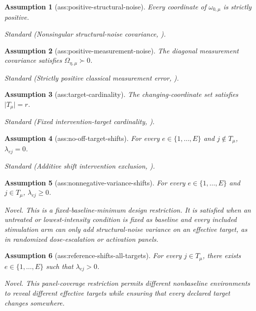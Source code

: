 \documentclass{article}
\newtheorem{assumption}{Assumption}
\begin{document}
\begin{assumption}[ass:positive-structural-noise]\label{ass:positive-structural-noise}
Every coordinate of \(\omega_{0,\mu}\) is strictly positive.
\par\smallskip\noindent\emph{Standard} (Nonsingular structural-noise covariance, \cite{YangGhassamiNafeaKiyavashZhangShpitser2022MeasurementError}).
\end{assumption}

\begin{assumption}[ass:positive-measurement-noise]\label{ass:positive-measurement-noise}
The diagonal measurement covariance satisfies \(\Omega_{\eta,\mu}\succ0\).
\par\smallskip\noindent\emph{Standard} (Strictly positive classical measurement error, \cite{YangGhassamiNafeaKiyavashZhangShpitser2022MeasurementError}).
\end{assumption}

\begin{assumption}[ass:target-cardinality]\label{ass:target-cardinality}
The changing-coordinate set satisfies \(\lvert T_{\mu}\rvert=r\).
\par\smallskip\noindent\emph{Standard} (Fixed intervention-target cardinality, \cite{YangSalehkaleybarKiyavash2024LIT}).
\end{assumption}

\begin{assumption}[ass:no-off-target-shifts]\label{ass:no-off-target-shifts}
For every \(e\in\{1,\ldots,E\}\) and \(j\notin T_{\mu}\), \(\lambda_{ej}=0\).
\par\smallskip\noindent\emph{Standard} (Additive shift intervention exclusion, \cite{RothenhauslerHeinzePetersMeinshausen2015BACKSHIFT}).
\end{assumption}

\begin{assumption}[ass:nonnegative-variance-shifts]\label{ass:nonnegative-variance-shifts}
For every \(e\in\{1,\ldots,E\}\) and \(j\in T_{\mu}\), \(\lambda_{ej}\ge0\).
\par\smallskip\noindent\emph{Novel.} This is a fixed-baseline-minimum design restriction.  It is satisfied when an untreated or lowest-intensity condition is fixed as baseline and every included stimulation arm can only add structural-noise variance on an effective target, as in randomized dose-escalation or activation panels.
\end{assumption}

\begin{assumption}[ass:reference-shifts-all-targets]\label{ass:reference-shifts-all-targets}
For every \(j\in T_{\mu}\), there exists \(e\in\{1,\ldots,E\}\) such that \(\lambda_{ej}>0\).
\par\smallskip\noindent\emph{Novel.} This panel-coverage restriction permits different nonbaseline environments to reveal different effective targets while ensuring that every declared target changes somewhere.
\end{assumption}
\end{document}
